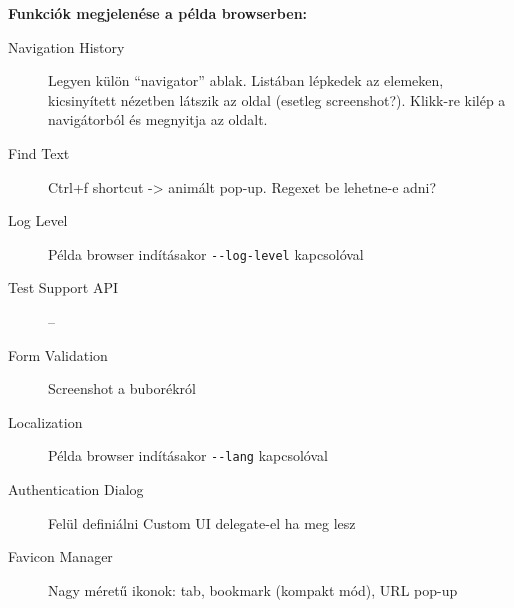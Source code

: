 \documentclass[12pt]{report}
\begin{document}
\noindent
\textbf{Funkciók megjelenése a példa browserben:}
\begin{description}
    \item[Navigation History] Legyen külön ``navigator'' ablak. Listában lépkedek az
        elemeken, kicsinyített nézetben látszik az oldal (esetleg screenshot?). Klikk-re
        kilép a navigátorból és megnyitja az oldalt.
    \item[Find Text] Ctrl+f shortcut -> animált pop-up. Regexet be lehetne-e adni?
    \item[Log Level] Példa browser indításakor \texttt{-{}-log-level} kapcsolóval
    \item[Test Support API] --
    \item[Form Validation] Screenshot a buborékról
    \item[Localization] Példa browser indításakor \texttt{-{}-lang} kapcsolóval
    \item[Authentication Dialog] Felül definiálni Custom UI delegate-el ha meg lesz
    \item[Favicon Manager] Nagy méretű ikonok: tab, bookmark (kompakt mód), URL pop-up
\end{description}

\end{document}

